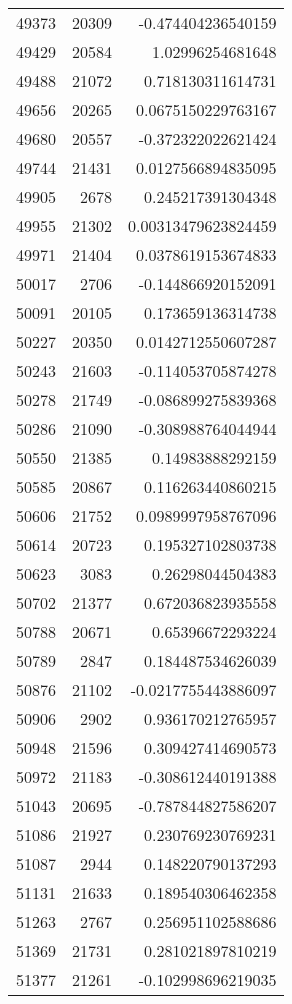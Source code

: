 \begin{tabular}{r | r | r}
49373 & 20309 & -0.474404236540159 \\
49429 & 20584 & 1.02996254681648 \\
49488 & 21072 & 0.718130311614731 \\
49656 & 20265 & 0.0675150229763167 \\
49680 & 20557 & -0.372322022621424 \\
49744 & 21431 & 0.0127566894835095 \\
49905 & 2678 & 0.245217391304348 \\
49955 & 21302 & 0.00313479623824459 \\
49971 & 21404 & 0.0378619153674833 \\
50017 & 2706 & -0.144866920152091 \\
50091 & 20105 & 0.173659136314738 \\
50227 & 20350 & 0.0142712550607287 \\
50243 & 21603 & -0.114053705874278 \\
50278 & 21749 & -0.086899275839368 \\
50286 & 21090 & -0.308988764044944 \\
50550 & 21385 & 0.14983888292159 \\
50585 & 20867 & 0.116263440860215 \\
50606 & 21752 & 0.0989997958767096 \\
50614 & 20723 & 0.195327102803738 \\
50623 & 3083 & 0.26298044504383 \\
50702 & 21377 & 0.672036823935558 \\
50788 & 20671 & 0.65396672293224 \\
50789 & 2847 & 0.184487534626039 \\
50876 & 21102 & -0.0217755443886097 \\
50906 & 2902 & 0.936170212765957 \\
50948 & 21596 & 0.309427414690573 \\
50972 & 21183 & -0.308612440191388 \\
51043 & 20695 & -0.787844827586207 \\
51086 & 21927 & 0.230769230769231 \\
51087 & 2944 & 0.148220790137293 \\
51131 & 21633 & 0.189540306462358 \\
51263 & 2767 & 0.256951102588686 \\
51369 & 21731 & 0.281021897810219 \\
51377 & 21261 & -0.102998696219035 \\

\end{tabular}
